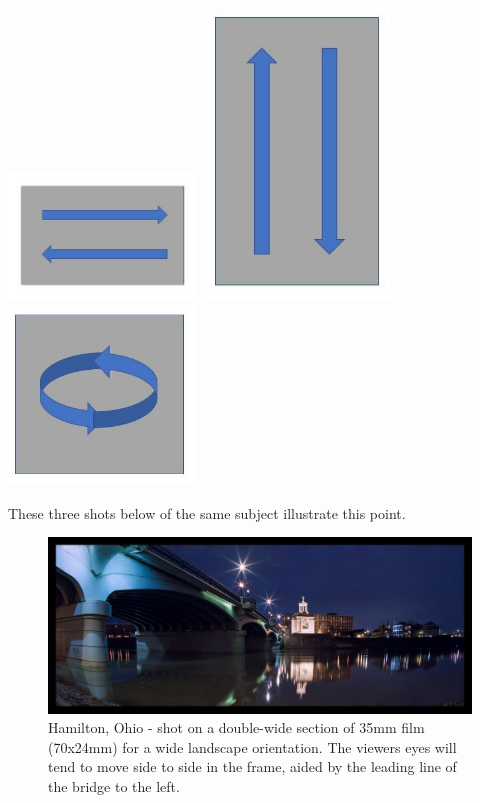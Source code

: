 \documentclass[a4paper]{article}
\begin{document}
\includegraphics[width=50mm]{img/Horizontal.jpeg}
\includegraphics[width=50mm]{img/Vertical.jpeg}
\includegraphics[width=50mm]{img/Square.jpeg}

These three shots below of the same subject illustrate this point. 
\begin{figure}[ht!]
    \centering
    \includegraphics[width=150mm]{img/49646000797_6f1991f098_k.jpeg}
    \caption{Hamilton, Ohio - shot on a double-wide section of 35mm film (70x24mm) for a wide landscape orientation. The viewers eyes will tend to move side to side in the frame, aided by the leading line of the bridge to the left.}
\end{figure}
\end{document}
